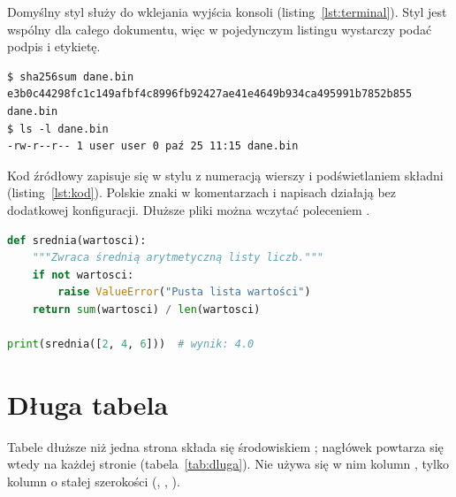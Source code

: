 Domyślny styl  służy do wklejania wyjścia konsoli (listing~\ref{lst:terminal}). Styl jest wspólny
dla całego dokumentu, więc w pojedynczym listingu wystarczy podać podpis i etykietę.

\begin{lstlisting}[caption={Przykład wyjścia terminala (sesja w konsoli)}, label={lst:terminal}]
$ sha256sum dane.bin
e3b0c44298fc1c149afbf4c8996fb92427ae41e4649b934ca495991b7852b855  dane.bin
$ ls -l dane.bin
-rw-r--r-- 1 user user 0 paź 25 11:15 dane.bin
\end{lstlisting}

Kod źródłowy zapisuje się w stylu  z numeracją wierszy i podświetlaniem składni (listing~\ref{lst:kod}).
Polskie znaki w komentarzach i napisach działają bez dodatkowej konfiguracji. Dłuższe pliki można wczytać poleceniem
.

\begin{lstlisting}[style=code, language=Python, caption={Przykładowy fragment kodu w języku Python}, label={lst:kod}]
def srednia(wartosci):
    """Zwraca średnią arytmetyczną listy liczb."""
    if not wartosci:
        raise ValueError("Pusta lista wartości")
    return sum(wartosci) / len(wartosci)

print(srednia([2, 4, 6]))  # wynik: 4.0
\end{lstlisting}

\section{Długa tabela}\label{sec:dluga-tabela}

Tabele dłuższe niż jedna strona składa się środowiskiem ; nagłówek powtarza się wtedy
na każdej stronie (tabela~\ref{tab:dluga}). Nie używa się w nim kolumn , tylko kolumn o stałej
szerokości (, , ).

